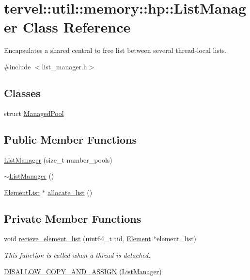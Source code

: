 \hypertarget{classtervel_1_1util_1_1memory_1_1hp_1_1_list_manager}{}\section{tervel\+:\+:util\+:\+:memory\+:\+:hp\+:\+:List\+Manager Class Reference}
\label{classtervel_1_1util_1_1memory_1_1hp_1_1_list_manager}


Encapsulates a shared central \textquotesingle{}to free list\textquotesingle{} between several thread-\/local lists.  




{\ttfamily \#include $<$list\+\_\+manager.\+h$>$}

\subsection*{Classes}
\begin{DoxyCompactItemize}
\item 
struct \hyperlink{structtervel_1_1util_1_1memory_1_1hp_1_1_list_manager_1_1_managed_pool}{Managed\+Pool}
\end{DoxyCompactItemize}
\subsection*{Public Member Functions}
\begin{DoxyCompactItemize}
\item 
\hyperlink{classtervel_1_1util_1_1memory_1_1hp_1_1_list_manager_a4b3bf525fc6328f81d4696e4357bf507}{List\+Manager} (size\+\_\+t number\+\_\+pools)
\item 
\hyperlink{classtervel_1_1util_1_1memory_1_1hp_1_1_list_manager_a6604ce2e6e426c8e42577356d7fc05c5}{$\sim$\+List\+Manager} ()
\item 
\hyperlink{classtervel_1_1util_1_1memory_1_1hp_1_1_element_list}{Element\+List} $\ast$ \hyperlink{classtervel_1_1util_1_1memory_1_1hp_1_1_list_manager_affa204b0a7ee633a109b9087e27bdad7}{allocate\+\_\+list} ()
\end{DoxyCompactItemize}
\subsection*{Private Member Functions}
\begin{DoxyCompactItemize}
\item 
void \hyperlink{classtervel_1_1util_1_1memory_1_1hp_1_1_list_manager_a09d48828ef1f36fadabfa16e3e7b1867}{recieve\+\_\+element\+\_\+list} (uint64\+\_\+t tid, \hyperlink{classtervel_1_1util_1_1memory_1_1hp_1_1_element}{Element} $\ast$element\+\_\+list)
\begin{DoxyCompactList}\small\item\em This function is called when a thread is detached. \end{DoxyCompactList}\item 
\hyperlink{classtervel_1_1util_1_1memory_1_1hp_1_1_list_manager_adc3d78ca9ecba0289b65ba06f3b558ad}{D\+I\+S\+A\+L\+L\+O\+W\+\_\+\+C\+O\+P\+Y\+\_\+\+A\+N\+D\+\_\+\+A\+S\+S\+I\+G\+N} (\hyperlink{classtervel_1_1util_1_1memory_1_1hp_1_1_list_manager}{List\+Manager})
\end{DoxyCompactItemize}
